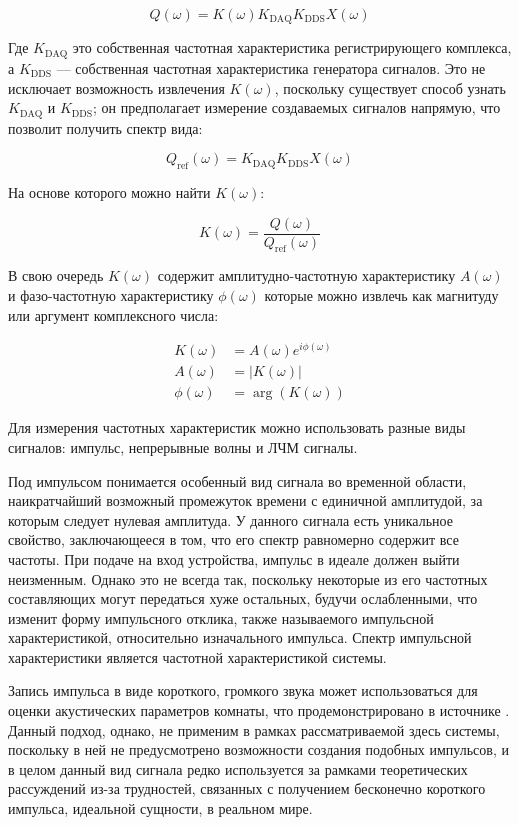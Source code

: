 \documentclass{report}
\begin{document}
$$
Q(\omega) = K(\omega) K_\text{DAQ} K_\text{DDS} X(\omega)
$$

Где $K_\text{DAQ}$ это собственная частотная характеристика регистрирующего комплекса, а $K_\text{DDS}$ --- собственная частотная характеристика генератора сигналов. Это не исключает возможность извлечения $K(\omega)$, поскольку существует способ узнать $K_\text{DAQ}$ и $K_\text{DDS}$; он предполагает измерение создаваемых сигналов напрямую, что позволит получить спектр вида:

$$
Q_\text{ref}(\omega) = K_\text{DAQ} K_\text{DDS} X(\omega)
$$

На основе которого можно найти $K(\omega)$:

\begin{equation}
K(\omega) = \frac{Q(\omega)}{Q_\text{ref}(\omega)}
\end{equation}

В свою очередь $K(\omega)$ содержит амплитудно-частотную характеристику $A(\omega)$ и фазо-частотную характеристику $\phi(\omega)$ которые можно извлечь как магнитуду или аргумент комплексного числа:

\begin{align}
K(\omega) &= A(\omega) e^{i \phi(\omega) } \\
A(\omega) &= \left|K(\omega)\right| \\
\phi(\omega) &= \arg\left(K\left(\omega\right)\right)
\end{align}

Для измерения частотных характеристик можно использовать разные виды сигналов: импульс, непрерывные волны и ЛЧМ сигналы.

Под импульсом понимается особенный вид сигнала во временной области, наикратчайший возможный промежуток времени с единичной амплитудой, за которым следует нулевая амплитуда. У данного сигнала есть уникальное свойство, заключающееся в том, что его спектр равномерно содержит все частоты. При подаче на вход устройства, импульс в идеале должен выйти неизменным. Однако это не всегда так, поскольку некоторые из его частотных составляющих могут передаться хуже остальных, будучи ослабленными, что изменит форму импульсного отклика, также называемого импульсной характеристикой, относительно изначального импульса. Спектр импульсной характеристики является частотной характеристикой системы.

Запись импульса в виде короткого, громкого звука может использоваться для оценки акустических параметров комнаты, что продемонстрировано в источнике \cite{thinkdsp}. Данный подход, однако, не применим в рамках рассматриваемой здесь системы, поскольку в ней не предусмотрено возможности создания подобных импульсов, и в целом данный вид сигнала редко используется за рамками теоретических рассуждений из-за трудностей, связанных с получением бесконечно короткого импульса, идеальной сущности, в реальном мире.
\end{document}
